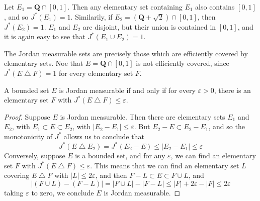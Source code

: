 \begin{example}
  Let $E_1 = \mathbf{Q} \cap [0,1]$. Then any elementary set containing $E_1$ also contains $[0,1]$, and so $J^*(E_1) = 1$. Similarily, if $E_2 = (\mathbf{Q} + \sqrt{2}) \cap [0,1]$, then $J^*(E_2) = 1$. $E_1$ and $E_2$ are disjoint, but their union is contained in $[0,1]$, and it is again easy to see that $J^*(E_1 \cup E_2) = 1$.
\end{example}

The Jordan measurable sets are precisely those which are efficiently covered by elementary sets. Noe that $E = \mathbf{Q} \cap [0,1]$ is not efficiently covered, since $J^*(E \bigtriangleup F) = 1$ for every elementary set $F$.

\begin{theorem}
    A bounded set $E$ is Jordan measurable if and only if for every $\varepsilon > 0$, there is an elementary set $F$ with $J^*(E \bigtriangleup F) \leq \varepsilon$.
\end{theorem}
\begin{proof}
  Suppose $E$ is Jordan measurable. Then there are elementary sets $E_1$ and $E_2$, with $E_1 \subset E \subset E_2$, with $|E_2 - E_1| \leq \varepsilon$. But $E_2 - E \subset E_2 - E_1$, and so the monotonicity of $J^*$ allows us to conclude that
  \[ J^*(E \bigtriangleup E_2) = J^*(E_2 - E) \leq |E_2 - E_1| \leq \varepsilon \]
  Conversely, suppose $E$ is a bounded set, and for any $\varepsilon$, we can find an elementary set $F$ with $J^*(E \bigtriangleup F) \leq \varepsilon$. This means that we can find an elementary set $L$ covering $E \bigtriangleup F$ with $|L| \leq 2\varepsilon$, and then $F - L \subset E \subset F \cup L$, and
  \[ |(F \cup L) - (F - L)| = |F \cup L| - |F - L| \leq |F| + 2\varepsilon - |F| \leq 2\varepsilon \]
  taking $\varepsilon$ to zero, we conclude $E$ is Jordan measurable.
\end{proof}

